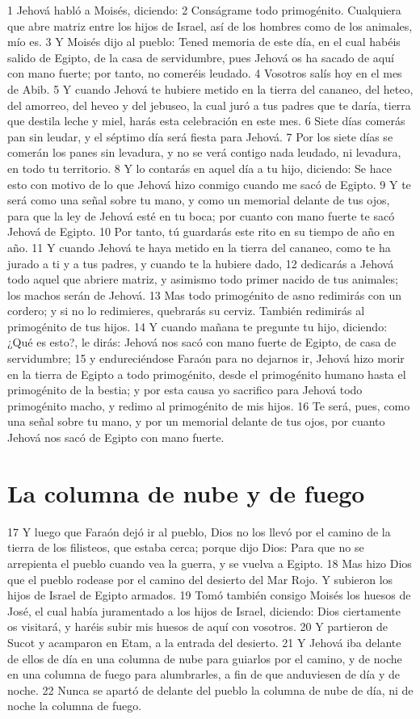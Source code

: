 1 Jehová habló a Moisés, diciendo:
2 Conságrame todo primogénito. Cualquiera que abre matriz entre los hijos de Israel, así de los hombres como de los animales, mío es.
3 Y Moisés dijo al pueblo: Tened memoria de este día, en el cual habéis salido de Egipto, de la casa de servidumbre, pues Jehová os ha sacado de aquí con mano fuerte; por tanto, no comeréis leudado.
4 Vosotros salís hoy en el mes de Abib.
5 Y cuando Jehová te hubiere metido en la tierra del cananeo, del heteo, del amorreo, del heveo y del jebuseo, la cual juró a tus padres que te daría, tierra que destila leche y miel, harás esta celebración en este mes.
6 Siete días comerás pan sin leudar, y el séptimo día será fiesta para Jehová.
7 Por los siete días se comerán los panes sin levadura, y no se verá contigo nada leudado, ni levadura, en todo tu territorio.
8 Y lo contarás en aquel día a tu hijo, diciendo: Se hace esto con motivo de lo que Jehová hizo conmigo cuando me sacó de Egipto.
9 Y te será como una señal sobre tu mano, y como un memorial delante de tus ojos, para que la ley de Jehová esté en tu boca; por cuanto con mano fuerte te sacó Jehová de Egipto.
10 Por tanto, tú guardarás este rito en su tiempo de año en año.
11 Y cuando Jehová te haya metido en la tierra del cananeo, como te ha jurado a ti y a tus padres, y cuando te la hubiere dado,
12 dedicarás a Jehová todo aquel que abriere matriz, y asimismo todo primer nacido de tus animales; los machos serán de Jehová.
13 Mas todo primogénito de asno redimirás con un cordero; y si no lo redimieres, quebrarás su cerviz. También redimirás al primogénito de tus hijos.
14 Y cuando mañana te pregunte tu hijo, diciendo: ¿Qué es esto?, le dirás: Jehová nos sacó con mano fuerte de Egipto, de casa de servidumbre;
15 y endureciéndose Faraón para no dejarnos ir, Jehová hizo morir en la tierra de Egipto a todo primogénito, desde el primogénito humano hasta el primogénito de la bestia; y por esta causa yo sacrifico para Jehová todo primogénito macho, y redimo al primogénito de mis hijos.
16 Te será, pues, como una señal sobre tu mano, y por un memorial delante de tus ojos, por cuanto Jehová nos sacó de Egipto con mano fuerte.

\section*{La columna de nube y de fuego}

17 Y luego que Faraón dejó ir al pueblo, Dios no los llevó por el camino de la tierra de los filisteos, que estaba cerca; porque dijo Dios: Para que no se arrepienta el pueblo cuando vea la guerra, y se vuelva a Egipto.
18 Mas hizo Dios que el pueblo rodease por el camino del desierto del Mar Rojo. Y subieron los hijos de Israel de Egipto armados.
19 Tomó también consigo Moisés los huesos de José, el cual había juramentado a los hijos de Israel, diciendo: Dios ciertamente os visitará, y haréis subir mis huesos de aquí con vosotros.
20 Y partieron de Sucot y acamparon en Etam, a la entrada del desierto.
21 Y Jehová iba delante de ellos de día en una columna de nube para guiarlos por el camino, y de noche en una columna de fuego para alumbrarles, a fin de que anduviesen de día y de noche.
22 Nunca se apartó de delante del pueblo la columna de nube de día, ni de noche la columna de fuego.

